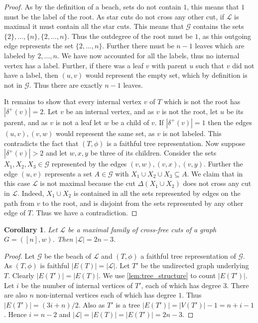 \documentclass[10pt,a4paper]{article}
\newcommand{\Lcal}{\mathcal{L}}
\newcommand{\Gcal}{\mathcal{G}}
\newcommand{\1}{\mathbf{1}}
\newtheorem{corollary}[theorem]{Corollary}
\theoremstyle{definition}
\begin{document}
\begin{proof}
As by the definition of a beach, sets do not contain $1$, this means that $1$ must be the label of the root.
As star cuts do not cross any other cut, if $\Lcal$ is maximal it must contain all the star cuts.  This means
that $\Gcal$ contains the sets $\{2\}, \ldots, \{n\}, \{2,\ldots, n\}$.  Thus the outdegree of the root must be $1$, as
this outgoing edge represents the set $\{2,\ldots, n\}$.  Further there must be $n-1$ leaves which are labeled by $2, \ldots, n$.
We have now accounted for all the labels, thus no internal vertex has a label. Further, if there was a leaf $v$ with parent $u$
such that $v$ did not have a label, then $(u,v)$ would represent the
empty set, which by definition is not in $\Gcal$.  Thus there are exactly $n-1$ leaves.

It remains to show that every internal vertex $v$ of $T$ which is not the root has $|\delta^+(v)| = 2$.  Let $v$ be an internal vertex, and as $v$ is not
the root, let $u$ be its parent, and as $v$ is not a leaf let $w$ be a child of $v$.  If $|\delta^+(v)| = 1$ then the edges $(u,v),(v,w)$ would represent the same set,
as $v$ is not labeled.  This contradicts the fact that $(T,\phi)$ is a faithful tree representation.  Now suppose $|\delta^+(v)| > 2$ and let $w,x,y$ be three of its children.  Consider
the sets $X_1, X_2,X_3 \in \Gcal$ represented by the edges $(v,w),(v,x),(v,y)$.  Further the edge $(u,v)$ represents a set $A \in \Gcal$ with
$X_1 \cup X_2 \cup X_3 \subseteq A$.
We claim that in this case $\Lcal$ is not maximal because the cut $\Delta(X_1 \cup X_2)$ does not cross any cut in $\Lcal$.  Indeed, $X_1 \cup X_2$ is contained
in all the sets represented by edges on the path from $v$ to the root, and is disjoint from the sets represented by any other edge of $T$.  Thus we have a contradiction.
\end{proof}

\begin{corollary}
\label{cor:maxcard}
Let $\Lcal$ be a maximal family of cross-free cuts of a graph $G= ([n],w)$.  Then $|\Lcal| = 2n-3$.
\end{corollary}

\begin{proof}
Let $\Gcal$ be the beach of $\Lcal$ and $(T,\phi)$ a faithful tree representation of $\Gcal$.  As $(T,\phi)$
is faithful $|E(T)| = |\Lcal|$.  Let $T'$ be the undirected graph underlying $T$.  Clearly $|E(T')| = |E(T)|$.  We use \cref{lem:tree_structure} to count $|E(T')|$.
Let $i$ be the number of internal vertices of $T'$, each of which has degree 3.  There are also $n$ non-internal vertices each of which has
degree $1$.  Thus $|E(T')| = (3i + n)/2$.  Also as $T'$ is a tree $|E(T')| = |V(T')|-1 = n+i-1$.  Hence $i = n-2$ and $|\Lcal| = |E(T)| = |E(T')| = 2n-3$.
\end{proof}
\end{document}
